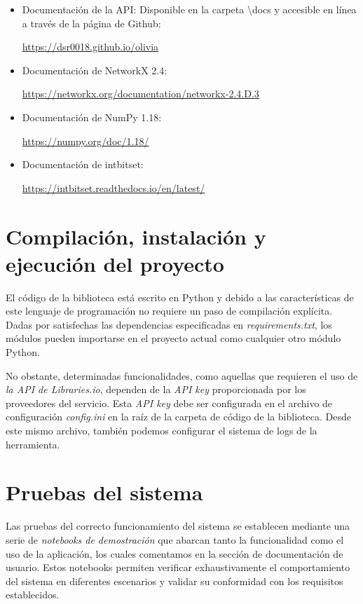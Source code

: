 \begin{itemize}
\item Documentación de la API: Disponible en la carpeta \textbackslash docs y accesible en línea a través de la página de Github: 

\url{https://dsr0018.github.io/olivia}
\item Documentación de NetworkX 2.4: 

\url{https://networkx.org/documentation/networkx-2.4.D.3}
\item Documentación de NumPy 1.18: 

\url{https://numpy.org/doc/1.18/}
\item Documentación de intbitset: 

\url{https://intbitset.readthedocs.io/en/latest/}
\end{itemize}

\section{Compilación, instalación y ejecución del proyecto}

El código de la biblioteca está escrito en Python y debido a las características de este lenguaje de programación
no requiere un paso de compilación explícita. Dadas por 
satisfechas las dependencias especificadas en \textit{requirements.txt}, los módulos pueden importarse 
en el proyecto actual como cualquier otro módulo Python.

No obstante, determinadas funcionalidades, como aquellas que requieren el uso de \textit{la API de Libraries.io}, 
dependen de la \textit{API key} proporcionada por los proveedores del servicio. Esta \textit{API key} 
debe ser configurada en el archivo de configuración \textit{config.ini} en la raíz de la carpeta de 
código de la biblioteca. Desde este mismo archivo, también podemos configurar el sistema de logs de 
la herramienta.

\section{Pruebas del sistema}

Las pruebas del correcto funcionamiento del sistema se establecen mediante una serie de \textit{notebooks de demostración} 
que abarcan tanto la funcionalidad como el uso de la aplicación, los cuales comentamos en la sección de documentación de usuario. Estos notebooks permiten verificar exhaustivamente el 
comportamiento del sistema en diferentes escenarios y validar su conformidad con los requisitos establecidos.

